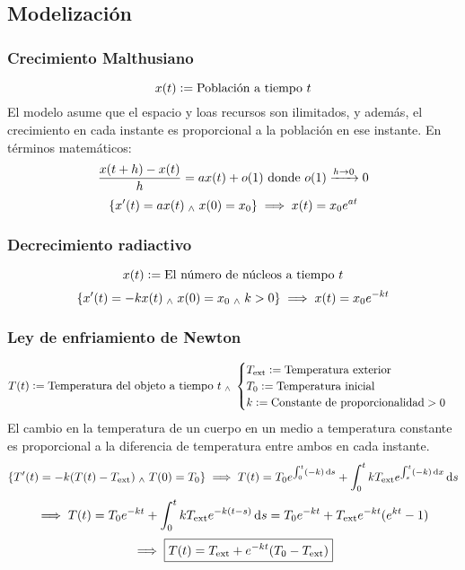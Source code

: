 \subsection{Modelización}
\subsubsection{Crecimiento Malthusiano}\label{sec:malthusiano}
\[x(t)\vcentcolon= \text{Población a tiempo $t$}\]
El modelo asume que el espacio y loas recursos son ilimitados, y además, el crecimiento en cada instante es proporcional a la población en ese instante. En términos matemáticos:
\[\frac{x(t+h)-x(t)}{h}=ax(t)+o(1) \text{ donde } o(1)\xrightarrow{h\rightarrow 0}0\]
\[\{x'(t) = ax(t) \; _{\wedge} \; x(0) = x_0\} \implies x(t)=x_0e^{at}\]

\subsubsection{Decrecimiento radiactivo}
\[x(t)\vcentcolon=\text{El número de núcleos a tiempo $t$}\]
\[\{x'(t)=-kx(t)\; _{\wedge} \; x(0)=x_0 \; _{\wedge} \; k > 0\} \implies x(t)=x_0e^{-kt}\]

\subsubsection{Ley de enfriamiento de Newton}
\[T(t)\vcentcolon= \text{Temperatura del objeto a tiempo $t$} \; _{\wedge} \; \begin{cases}
		T_{\text{ext}} \vcentcolon= \text{Temperatura exterior} \\
		T_{0} \vcentcolon= \text{Temperatura inicial}          \\
		k\vcentcolon= \text{Constante de proporcionalidad} > 0
	\end{cases}\]
El cambio en la temperatura de un cuerpo en un medio a temperatura constante es proporcional a la diferencia de temperatura entre ambos en cada instante.
\[\{T'(t)=-k(T(t)-T_{\tex{ext}})\we T(0)=T_0\} \implies T(t)=T_0e^{\int_0^t(-k)\odif{s}}+\int_0^tkT_{\tex{ext}}e^{\int_s^t(-k)\odif{x}}\odif{s}\]
\[\implies T(t)=T_0e^{-kt}+\int_0^tkT_{\tex{ext}}e^{-k(t-s)}\odif{s}=T_0e^{-kt}+T_{\tex{ext}}e^{-kt}(e^{kt}-1)\]
\[\implies \boxed{T(t)= T_{\text{ext}} + e^{-kt}(T_0-T_{\text{ext}})}\]

